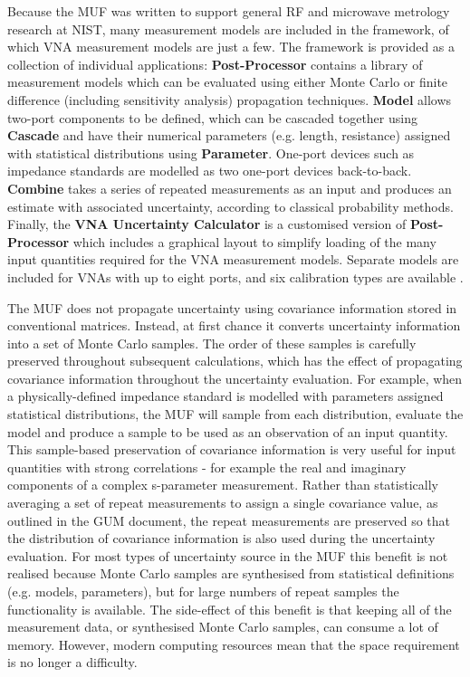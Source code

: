 \documentclass[../thesis/thesis.tex]{subfiles}
\begin{document}
\begin{refsection}
Because the MUF was written to support general RF and microwave metrology research at NIST, many measurement models are included in the framework, of which VNA measurement models are just a few. The framework is provided as a collection of individual applications: \textbf{Post-Processor} contains a library of measurement models which can be evaluated using either Monte Carlo or finite difference (including sensitivity analysis) propagation techniques. \textbf{Model} allows two-port components to be defined, which can be cascaded together using \textbf{Cascade} and have their numerical parameters (e.g. length, resistance) assigned with statistical distributions using \textbf{Parameter}. One-port devices such as impedance standards are modelled as two one-port devices back-to-back. \textbf{Combine} takes a series of repeated measurements as an input and produces an estimate with associated uncertainty, according to classical probability methods. Finally, the \textbf{VNA Uncertainty Calculator} is a customised version of \textbf{Post-Processor} which includes a graphical layout to simplify loading of the many input quantities required for the VNA measurement models. Separate models are included for VNAs with up to eight ports, and six calibration types are available \cite{Jargon_2019}.

The MUF does not propagate uncertainty using covariance information stored in conventional matrices. Instead, at first chance it converts uncertainty information into a set of Monte Carlo samples. The order of these samples is carefully preserved throughout subsequent calculations, which has the effect of propagating covariance information throughout the uncertainty evaluation. For example, when a physically-defined impedance standard is modelled with parameters assigned statistical distributions, the MUF will sample from each distribution, evaluate the model and produce a sample to be used as an observation of an input quantity. This sample-based preservation of covariance information is very useful for input quantities with strong correlations - for example the real and imaginary components of a complex s-parameter measurement. Rather than statistically averaging a set of repeat measurements to assign a single covariance value, as outlined in the GUM document, the repeat measurements are preserved so that the distribution of covariance information is also used during the uncertainty evaluation. For most types of uncertainty source in the MUF this benefit is not realised because Monte Carlo samples are synthesised from statistical definitions (e.g. models, parameters), but for large numbers of repeat samples the functionality is available. The side-effect of this benefit is that keeping all of the measurement data, or synthesised Monte Carlo samples, can consume a lot of memory. However, modern computing resources mean that the space requirement is no longer a difficulty.


\end{refsection}
\end{document}
